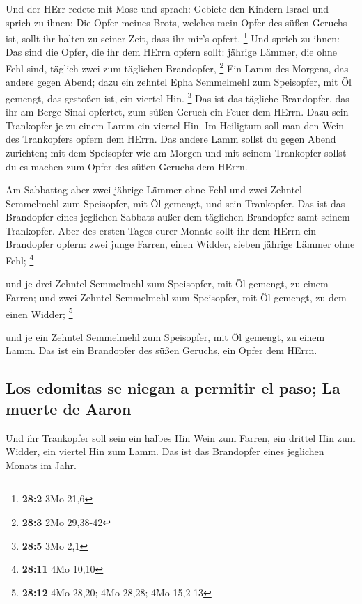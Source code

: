  Und der HErr redete mit Mose und sprach: 
Gebiete den Kindern Israel und sprich zu ihnen: Die Opfer meines Brots,
welches mein Opfer des süßen Geruchs ist, sollt ihr halten zu seiner
Zeit, dass ihr mir's opfert. \footnote{\textbf{28:2} 3Mo 21,6}
 Und sprich zu ihnen: Das sind die Opfer, die ihr dem
HErrn opfern sollt: jährige Lämmer, die ohne Fehl sind, täglich zwei zum
täglichen Brandopfer, \footnote{\textbf{28:3} 2Mo 29,38-42}
 Ein Lamm des Morgens, das andere gegen Abend;
 dazu ein zehntel Epha Semmelmehl zum Speisopfer, mit Öl
gemengt, das gestoßen ist, ein viertel Hin. \footnote{\textbf{28:5} 3Mo
  2,1}  Das ist das tägliche Brandopfer, das ihr am Berge
Sinai opfertet, zum süßen Geruch ein Feuer dem HErrn. 
Dazu sein Trankopfer je zu einem Lamm ein viertel Hin. Im Heiligtum soll
man den Wein des Trankopfers opfern dem HErrn.  Das andere
Lamm sollst du gegen Abend zurichten; mit dem Speisopfer wie am Morgen
und mit seinem Trankopfer sollst du es machen zum Opfer des süßen
Geruchs dem HErrn.

 Am Sabbattag aber zwei jährige Lämmer ohne Fehl und zwei
Zehntel Semmelmehl zum Speisopfer, mit Öl gemengt, und sein Trankopfer.
 Das ist das Brandopfer eines jeglichen Sabbats außer dem
täglichen Brandopfer samt seinem Trankopfer.  Aber des
ersten Tages eurer Monate sollt ihr dem HErrn ein Brandopfer opfern:
zwei junge Farren, einen Widder, sieben jährige Lämmer ohne Fehl;
\footnote{\textbf{28:11} 4Mo 10,10}

 und je drei Zehntel Semmelmehl zum Speisopfer, mit Öl
gemengt, zu einem Farren; und zwei Zehntel Semmelmehl zum Speisopfer,
mit Öl gemengt, zu dem einen Widder; \footnote{\textbf{28:12} 4Mo 28,20;
  4Mo 28,28; 4Mo 15,2-13}

 und je ein Zehntel Semmelmehl zum Speisopfer, mit Öl
gemengt, zu einem Lamm. Das ist ein Brandopfer des süßen Geruchs, ein
Opfer dem HErrn.

\hypertarget{los-edomitas-se-niegan-a-permitir-el-paso-la-muerte-de-aaron}{%
\subsection{Los edomitas se niegan a permitir el paso; La muerte de
Aaron}\label{los-edomitas-se-niegan-a-permitir-el-paso-la-muerte-de-aaron}}

 Und ihr Trankopfer soll sein ein halbes Hin Wein zum
Farren, ein drittel Hin zum Widder, ein viertel Hin zum Lamm. Das ist
das Brandopfer eines jeglichen Monats im Jahr.

